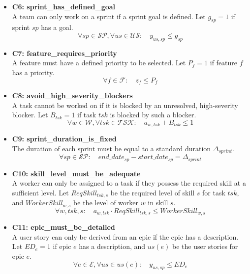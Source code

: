 \documentclass[11pt]{article}
\begin{document}
\begin{itemize}
    \item \textbf{C6: sprint\_has\_defined\_goal} \\
    A team can only work on a sprint if a sprint goal is defined. Let $g_{sp} = 1$ if sprint $sp$ has a goal.
    $$ \forall sp \in \mathcal{SP}, \forall us \in \mathcal{US}: \quad y_{us, sp} \le g_{sp} $$
    
    \item \textbf{C7: feature\_requires\_priority} \\
    A feature must have a defined priority to be selected. Let $P_f=1$ if feature $f$ has a priority.
    $$ \forall f \in \mathcal{F}: \quad z_f \le P_f $$
    
    \item \textbf{C8: avoid\_high\_severity\_blockers} \\
    A task cannot be worked on if it is blocked by an unresolved, high-severity blocker. Let $B_{tsk}=1$ if task $tsk$ is blocked by such a blocker.
    $$ \forall w \in \mathcal{W}, \forall tsk \in \mathcal{TSK}: \quad a_{w, tsk} + B_{tsk} \le 1 $$

    \item \textbf{C9: sprint\_duration\_is\_fixed} \\
    The duration of each sprint must be equal to a standard duration $\Delta_{sprint}$.
    $$ \forall sp \in \mathcal{SP}: \quad end\_date_{sp} - start\_date_{sp} = \Delta_{sprint} $$
    
    \item \textbf{C10: skill\_level\_must\_be\_adequate} \\
    A worker can only be assigned to a task if they possess the required skill at a sufficient level. Let $ReqSkill_{tsk,s}$ be the required level of skill $s$ for task $tsk$, and $WorkerSkill_{w,s}$ be the level of worker $w$ in skill $s$.
    $$ \forall w, tsk, s: \quad a_{w, tsk} \cdot ReqSkill_{tsk,s} \le WorkerSkill_{w,s} $$
    
    \item \textbf{C11: epic\_must\_be\_detailed} \\
    A user story can only be derived from an epic if the epic has a description. Let $ED_e=1$ if epic $e$ has a description, and $us(e)$ be the user stories for epic $e$.
    $$ \forall e \in \mathcal{E}, \forall us \in us(e): \quad y_{us, sp} \le ED_e $$
\end{itemize}

\end{document}
